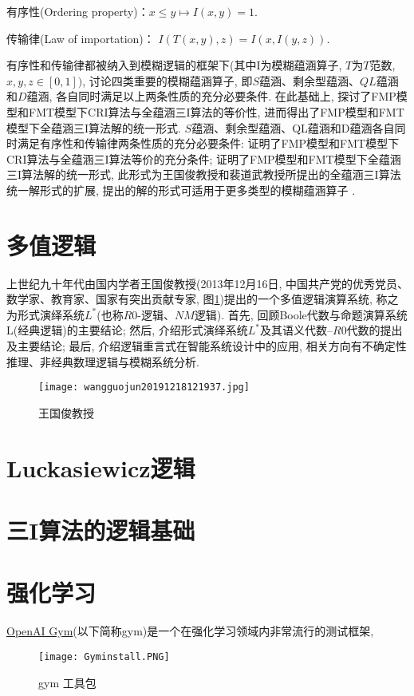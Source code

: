 有序性(Ordering property)：$ x\leq y\longmapsto I(x,y)=1$.

传输律(Law of importation)： $I(T(x,y),z)=I(x,I(y,z))$.

有序性和传输律都被纳入到模糊逻辑的框架下(其中I为模糊蕴涵算子, $T$为$T$范数, $x,y,z\in [0,1])$, 讨论四类重要的模糊蕴涵算子, 即$S$蕴涵、剩余型蕴涵、$QL$蕴涵和$D$蕴涵, 各自同时满足以上两条性质的充分必要条件. 在此基础上, 探讨了FMP模型和FMT模型下CRI算法与全蕴涵三I算法的等价性, 进而得出了FMP模型和FMT模型下全蕴涵三I算法解的统一形式.
$S$蕴涵、剩余型蕴涵、QL蕴涵和D蕴涵各自同时满足有序性和传输律两条性质的充分必要条件: 证明了FMP模型和FMT模型下CRI算法与全蕴涵三I算法等价的充分条件; 证明了FMP模型和FMT模型下全蕴涵三I算法解的统一形式, 此形式为王国俊教授和裴道武教授所提出的全蕴涵三I算法统一解形式的扩展, 提出的解的形式可适用于更多类型的模糊蕴涵算子 .
\section{多值逻辑}
上世纪九十年代由国内学者王国俊教授(2013年12月16日, 中国共产党的优秀党员、数学家、教育家、国家有突出贡献专家, 图\ref{wangguojun20191218121937})提出的一个多值逻辑演算系统, 称之为形式演绎系统$L^*$(也称$R0$-逻辑、$NM$逻辑). 首先, 回顾Boole代数与命题演算系统L(经典逻辑)的主要结论; 然后, 介绍形式演绎系统$L^*$及其语义代数--$R0$代数的提出及主要结论; 最后, 介绍逻辑重言式在智能系统设计中的应用, 相关方向有不确定性推理、非经典数理逻辑与模糊系统分析.
\begin{figure}[H]
\centering
\texttt{[image: wangguojun20191218121937.jpg]}
\caption{王国俊教授}
\label{wangguojun20191218121937}
\end{figure}
\section{Luckasiewicz逻辑}
\section{三I算法的逻辑基础}
\section{强化学习}
\href{https://gym.openai.com/}{OpenAI Gym}(以下简称gym)是一个在强化学习领域内非常流行的测试框架,
\begin{figure}[H]
\centering
\texttt{[image: Gyminstall.PNG]}
\caption{gym 工具包}
\label{Gyminstall}
\end{figure}

